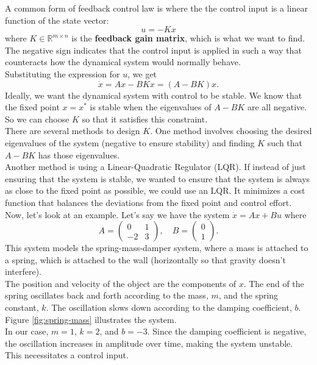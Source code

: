 \documentclass[12pt]{article}
\newcommand{\dx}{\dot{x}}
\begin{document}
A common form of feedback control law is where the the control input is a linear function of the state vector:
$$u = -Kx$$
where $K \in \mathbb{R}^{m \times n}$ is the \textbf{feedback gain matrix}, which is what we want to find. The negative sign indicates that the control input is applied in such a way that counteracts how the dynamical system would normally behave. \\

Substituting the expression for $u$, we get
$$\dx = Ax - BKx = (A - BK)x.$$
Ideally, we want the dynamical system with control to be stable. We know that the fixed point $x = x^*$ is stable when the eigenvalues of $A - BK$ are all negative. So we can choose $K$ so that it satisfies this constraint. \\

There are several methods to design $K$. One method involves choosing the desired eigenvalues of the system (negative to ensure stability) and finding $K$ such that $A - BK$ has those eigenvalues. \\

Another method is using a Linear-Quadratic Regulator (LQR). If instead of just ensuring that the system is stable, we wanted to ensure that the system is always as close to the fixed point as possible, we could use an LQR. It minimizes a cost function that balances the deviations from the fixed point and control effort. \cite{lqr} \\

Now, let's look at an example. Let's say we have the system $\dx = Ax + Bu$ where
$$A = \begin{pmatrix} 0 & 1 \\ -2 & 3 \end{pmatrix}, \quad B = \begin{pmatrix} 0 \\ 1 \end{pmatrix}.$$
This system models the spring-mass-damper system, where a mass is attached to a spring, which is attached to the wall (horizontally so that gravity doesn't interfere). \\

The position and velocity of the object are the components of $x$. The end of the spring oscillates back and forth according to the mass, $m$, and the spring constant, $k$. The oscillation slows down according to the damping coefficient, $b$. Figure \ref{fig:spring-mass} illustrates the system. \\

In our case, $m = 1$, $k = 2$, and $b = -3$. Since the damping coefficient is negative, the oscillation increases in amplitude over time, making the system unstable. This necessitates a control input. \\
\end{document}
